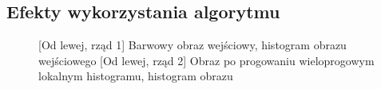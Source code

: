 \documentclass[a4paper,12pt, titlepage]{report}
\begin{document}
\subsection*{Efekty wykorzystania algorytmu}
\begin{figure}[h]
    \centering
    \qquad
    \caption{[Od lewej, rząd 1] Barwowy obraz wejściowy, histogram obrazu wejściowego [Od lewej, rząd 2] Obraz po progowaniu wieloprogowym lokalnym histogramu, histogram obrazu}%
    \label{fig:geo_after_grey1}%
\end{figure}
\end{document}
